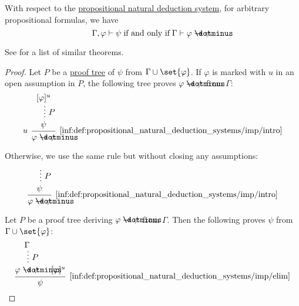 \begin{theorem}\label{thm:propositional_syntactic_deduction_theorem}
  With respect to the \hyperref[def:propositional_natural_deduction_system]{propositional natural deduction system}, for arbitrary propositional formulas, we have
  \begin{equation*}
    \Gamma, \varphi \vdash \psi \T{if and only if} \Gamma \vdash \varphi \synimplies \psi.
  \end{equation*}
\end{theorem}
\begin{comments}
  \item See  for a list of similar theorems.
\end{comments}
\begin{proof}
  \SufficiencySubProof Let \( P \) be a \hyperref[def:natural_deduction_proof_tree]{proof tree} of \( \psi \) from \( \Gamma \cup \set{ \varphi } \). If \( \varphi \) is marked with \( u \) in an open assumption in \( P \), the following tree proves \( \varphi \synimplies \psi \) from \( \Gamma \):
  \begin{equation*}
    \begin{prooftree}
      \hypo{ [\varphi]^u }
      \ellipsis { \( P \) } { \psi }
      \infer[left label=\( u \)]1[\ref{inf:def:propositional_natural_deduction_systems/imp/intro}]{ \varphi \synimplies \psi }
    \end{prooftree}
  \end{equation*}

  Otherwise, we use the same rule but without closing any assumptions:
  \begin{equation*}
    \begin{prooftree}
      \hypo{}
      \ellipsis { \( P \) } { \psi }
      \infer1[\ref{inf:def:propositional_natural_deduction_systems/imp/intro}]{ \varphi \synimplies \psi }
    \end{prooftree}
  \end{equation*}

  \NecessitySubProof Let \( P \) be a proof tree deriving \( \varphi \synimplies \psi \) from \( \Gamma \). Then the following proves \( \psi \) from \( \Gamma \cup \set{ \varphi } \):
  \begin{equation*}
    \begin{prooftree}
      \hypo {\Gamma}
      \ellipsis { \( P \) } { \varphi \synimplies \psi }

      \hypo { [\varphi]^u }
      \infer2[\ref{inf:def:propositional_natural_deduction_systems/imp/elim}]{ \psi }
    \end{prooftree}
  \end{equation*}
\end{proof}

